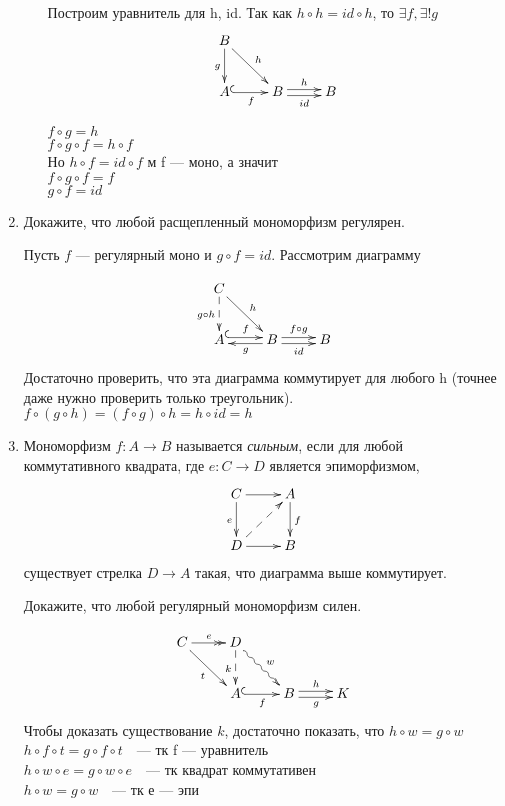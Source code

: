 \documentclass[draft]{article}
\begin{document}
\begin{enumerate}
\begin{enumerate}
Построим уравнитель для h, id. Так как $h \circ h = id \circ h$, то $\exists f, \exists!g$
\[ \xymatrix{ B \ar[dr]^{h}\ar[d]_g & & \\
              A \ar@{^{(}->}[r]_f & B \ar@<-.5ex>[r]_{id}\ar@<.5ex>[r]^{h} & B
            } \]

$f \circ g = h$\\
$f \circ g \circ f = h \circ f$\\
Но $h \circ f = id \circ f$ м f --- моно, а значит\\
$f \circ g \circ f = f$\\
$g \circ f = id$

\end{enumerate}

\item Докажите, что любой расщепленный мономорфизм регулярен.

Пусть  $f$ --- регулярный моно и $g\circ f = id$. Рассмотрим диаграмму

\[ \xymatrix{ C \ar[dr]^{h}\ar@{-->}[d]_{g\circ h} & & \\
              A \ar@{^{(}->}@<.5ex>[r]^f & B \ar@<.5ex>[l]^g \ar@<-.5ex>[r]_{id}\ar@<.5ex>[r]^{f\circ g} & B
            } \]
Достаточно проверить, что эта диаграмма коммутирует для любого h (точнее даже нужно проверить только треугольник).\\
$f\circ (g\circ h) = (f \circ g) \circ h = h \circ id = h$

\item Мономорфизм $f : A \to B$ называется \emph{сильным}, если для любой коммутативного квадрата, где $e : C \to D$ является эпиморфизмом,
\[ \xymatrix{ C \ar[r] \ar[d]_e      & A \ar[d]^f \\
              D \ar[r] \ar@{-->}[ur] & B
            } \]
существует стрелка $D \to A$ такая, что диаграмма выше коммутирует.

Докажите, что любой регулярный мономорфизм силен.

\[ \xymatrix{ 
C \ar@{->>}[r]^e \ar[dr]_t & D \ar@{~>}[dr]^w \ar@{-->}[d]_k &   & \\
  & A \ar@{^{(}->}[r]_f & B \ar@<-0.5ex>[r]_g \ar@<0.5ex>[r]^h & K
 } \]
Чтобы доказать существование $k$, достаточно показать, что $h\circ w = g \circ w$\\
$h\circ f \circ t = g \circ f \circ t~~~$ --- тк f --- уравнитель\\
$h\circ w \circ e = g \circ w \circ e~~~$ --- тк квадрат коммутативен\\
$h\circ w = g \circ w~~~$ --- тк е --- эпи


\end{enumerate}
\end{document}
